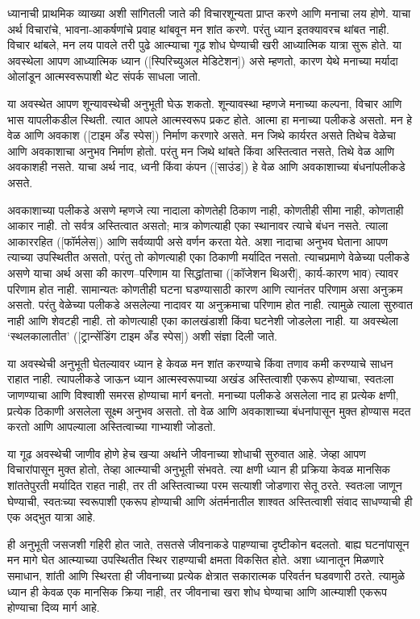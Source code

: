 ध्यानाची प्राथमिक व्याख्या अशी सांगितली जाते की विचारशून्यता प्राप्त करणे आणि मनाचा लय होणे. याचा अर्थ विचारांचे, भावना-आकर्षणांचे प्रवाह थांबवून मन शांत करणे. परंतु ध्यान इतक्यावरच थांबत नाही. विचार थांबले, मन लय पावले तरी पुढे आत्म्याचा गूढ शोध घेण्याची खरी आध्यात्मिक यात्रा सुरू होते. या अवस्थेला आपण आध्यात्मिक ध्यान ([स्पिरिच्युअल मेडिटेशन]) असे म्हणतो, कारण येथे मनाच्या मर्यादा ओलांडून आत्मस्वरूपाशी थेट संपर्क साधला जातो.

या अवस्थेत आपण शून्यावस्थेची अनुभूती घेऊ शकतो. शून्यावस्था म्हणजे मनाच्या कल्पना, विचार आणि भास यापलीकडील स्थिती. त्यात आपले आत्मस्वरूप प्रकट होते. आत्मा हा मनाच्या पलीकडे असतो. मन हे वेळ आणि अवकाश ([टाइम अँड स्पेस]) निर्माण करणारे असते. मन जिथे कार्यरत असते तिथेच वेळेचा आणि अवकाशाचा अनुभव निर्माण होतो. परंतु मन जिथे थांबते किंवा अस्तित्वात नसते, तिथे वेळ आणि अवकाशही नसते. याचा अर्थ नाद, ध्वनी किंवा कंपन ([साउंड]) हे वेळ आणि अवकाशाच्या बंधनांपलीकडे असते.

अवकाशाच्या पलीकडे असणे म्हणजे त्या नादाला कोणतेही ठिकाण नाही, कोणतीही सीमा नाही, कोणताही आकार नाही. तो सर्वत्र अस्तित्वात असतो; मात्र कोणत्याही एका स्थानावर त्याचे बंधन नसते. त्याला आकाररहित ([फॉर्मलेस]) आणि सर्वव्यापी असे वर्णन करता येते. अशा नादाचा अनुभव घेताना आपण त्याच्या उपस्थितीत असतो, परंतु तो कोणत्याही एका ठिकाणी मर्यादित नसतो.
त्याचप्रमाणे वेळेच्या पलीकडे असणे याचा अर्थ असा की कारण–परिणाम या सिद्धांताचा ([कॉजेशन थिअरी], कार्य-कारण भाव) त्यावर परिणाम होत नाही. सामान्यतः कोणतीही घटना घडण्यासाठी कारण आणि त्यानंतर परिणाम असा अनुक्रम असतो. परंतु वेळेच्या पलीकडे असलेल्या नादावर या अनुक्रमाचा परिणाम होत नाही. त्यामुळे त्याला सुरुवात नाही आणि शेवटही नाही. तो कोणत्याही एका कालखंडाशी किंवा घटनेशी जोडलेला नाही. या अवस्थेला ‘स्थलकालातीत’ ([ट्रान्सेंडिंग टाइम अँड स्पेस]) अशी संज्ञा दिली जाते.

या अवस्थेची अनुभूती घेतल्यावर ध्यान हे केवळ मन शांत करण्याचे किंवा तणाव कमी करण्याचे साधन राहात नाही. त्यापलीकडे जाऊन ध्यान आत्मस्वरूपाच्या अखंड अस्तित्वाशी एकरूप होण्याचा, स्वतःला जाणण्याचा आणि विश्वाशी समरस होण्याचा मार्ग बनतो. मनाच्या पलीकडे असलेला नाद हा प्रत्येक क्षणी, प्रत्येक ठिकाणी असलेला सूक्ष्म अनुभव असतो. तो वेळ आणि अवकाशाच्या बंधनांपासून मुक्त होण्यास मदत करतो आणि आपल्याला अस्तित्वाच्या गाभ्याशी जोडतो.

या गूढ अवस्थेची जाणीव होणे हेच खऱ्या अर्थाने जीवनाच्या शोधाची सुरुवात आहे. जेव्हा आपण विचारांपासून मुक्त होतो, तेव्हा आत्म्याची अनुभूती संभवते. त्या क्षणी ध्यान ही प्रक्रिया केवळ मानसिक शांततेपुरती मर्यादित राहत नाही, तर ती अस्तित्वाच्या परम सत्याशी जोडणारा सेतू ठरते. स्वतःला जाणून घेण्याची, स्वतःच्या स्वरूपाशी एकरूप होण्याची आणि अंतर्मनातील शाश्वत अस्तित्वाशी संवाद साधण्याची ही एक अद्भुत यात्रा आहे.

ही अनुभूती जसजशी गहिरी होत जाते, तसतसे जीवनाकडे पाहण्याचा दृष्टीकोन बदलतो. बाह्य घटनांपासून मन मागे घेत आत्म्याच्या उपस्थितीत स्थिर राहण्याची क्षमता विकसित होते. अशा ध्यानातून मिळणारे समाधान, शांती आणि स्थिरता ही जीवनाच्या प्रत्येक क्षेत्रात सकारात्मक परिवर्तन घडवणारी ठरते. त्यामुळे ध्यान ही केवळ एक मानसिक क्रिया नाही, तर जीवनाचा खरा शोध घेण्याचा आणि आत्म्याशी एकरूप होण्याचा दिव्य मार्ग आहे.

